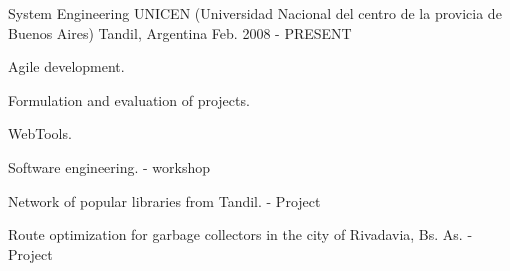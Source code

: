 


\begin{cventries}


\cventry
{System Engineering} %
{UNICEN (Universidad Nacional del centro de la provicia de Buenos Aires)} %
{Tandil, Argentina} %
{Feb. 2008 - PRESENT} %
{ %
\begin{cvitems}
\item {Agile development.}
\item {Formulation and evaluation of projects.}
\item {WebTools.}
\item {Software engineering. - workshop}
\item {Network of popular libraries from Tandil. - Project}
\item {Route optimization for garbage collectors in the city of Rivadavia, Bs. As. - Project}
\end{cvitems}
}


\end{cventries}
